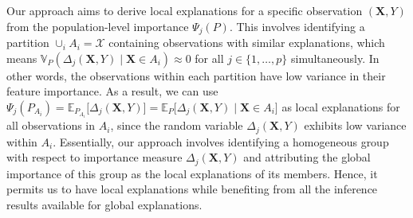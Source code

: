 \documentclass{article}
\newcommand\X{\boldsymbol{X}}
\theoremstyle{plain}
\theoremstyle{definition}
\theoremstyle{remark}
\newcommand{\ours}{\textcolor{ours}{\textbf{R-LOCO}}}
\newcommand{\loco}{\textcolor{loco}{\textbf{LOCO}}}
\begin{document}
Our approach aims to derive local explanations for a specific observation $(\X, Y)$ from the population-level importance $\Psi_{j}(P)$. This involves identifying a partition $ \cup_i A_i = \mathcal{X}$ containing observations with similar explanations, which means $\mathbb{V}_P(\Delta_j(\X, Y) \; \vert \; \X \in A_i) \approx 0$ for all $j \in \{1, \dots, p\}$ simultaneously. In other words, the observations within each partition have low variance in their feature importance. As a result, we can use $\Psi_{j}(P_{A_i}) = \mathbb{E}_{P_{A_i}}\big[ \Delta_j(\X, Y)\big] = \mathbb{E}_{P}\big[ \Delta_j(\X, Y) \; \vert \; \X \in A_i\big]$ as local explanations for all observations in $A_i$, since the random variable $\Delta_j(\X, Y)$ exhibits low variance within $A_i$. Essentially, our approach involves identifying a homogeneous group with respect to importance measure $\Delta_j(\X, Y)$ and attributing the global importance of this group as the local explanations of its members. Hence, it permits us to have local explanations while benefiting from all the inference results available for global explanations. 
\end{document}
